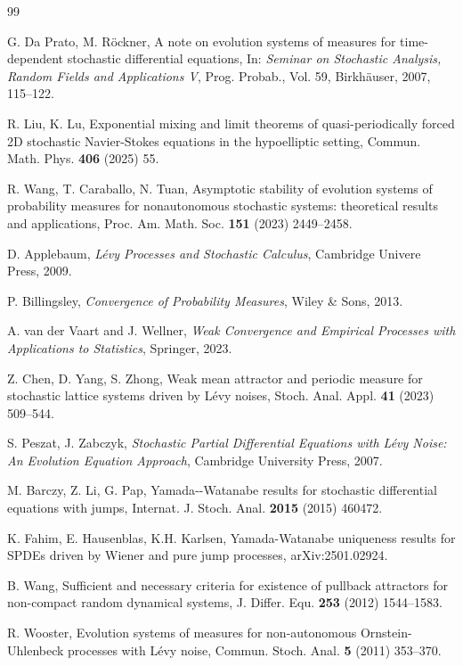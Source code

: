 \documentclass[11pt]{article}
\numberwithin{equation}{section}
\theoremstyle{plain}
\begin{document}
\begin{thebibliography}{99}
	

	G. Da Prato, M. R{\"o}ckner,
	A note on evolution systems of measures for time-dependent stochastic differential equations,
	In: \emph{Seminar on Stochastic Analysis, Random Fields and Applications V}, Prog. Probab., Vol. 59, Birkh{\"a}user, 2007, 115--122.
	
	R. Liu, K. Lu,
	Exponential mixing and limit theorems of quasi-periodically forced 2D stochastic Navier-Stokes equations in the hypoelliptic setting,
	Commun. Math. Phys. \textbf{406} (2025) 55.
	
	R. Wang, T. Caraballo, N. Tuan,
	Asymptotic stability of evolution systems of probability measures for nonautonomous stochastic systems: theoretical results and applications,
	Proc. Am. Math. Soc. \textbf{151} (2023) 2449--2458.
	
	
	D. Applebaum,
	\emph{L{\'e}vy Processes and Stochastic Calculus},
	Cambridge Univere Press, 2009.	
	


	P. Billingsley,
	\emph{Convergence of Probability Measures},
	Wiley \& Sons, 2013.
	
	A. van der Vaart and J. Wellner,
	\emph{Weak Convergence and Empirical Processes with Applications to Statistics},
	Springer, 2023.	
	
	Z. Chen, D. Yang, S. Zhong,
	Weak mean attractor and periodic measure for stochastic lattice systems driven by L{\'e}vy noises,
	Stoch. Anal. Appl. \textbf{41} (2023) 509--544.
		
	S. Peszat, J. Zabczyk,
	\emph{Stochastic Partial Differential Equations with L{\'e}vy Noise: An Evolution Equation Approach},
	Cambridge University Press, 2007. 
	
	M. Barczy, Z. Li, G. Pap, 
	Yamada‐-Watanabe results for stochastic differential equations with jumps,
	Internat. J. Stoch. Anal. \textbf{2015} (2015) 460472.
	
	K. Fahim, E. Hausenblas, K.H. Karlsen,
	Yamada-Watanabe uniqueness results for SPDEs driven by Wiener and pure jump processes, 
	arXiv:2501.02924.
	
	B. Wang, 
	Sufficient and necessary criteria for existence of pullback attractors for non-compact random dynamical systems, 
	J. Differ. Equ. \textbf{253} (2012) 1544--1583.	
	
	
	R. Wooster,
	Evolution systems of measures for non-autonomous Ornstein-Uhlenbeck processes with L{\'e}vy noise,
	Commun. Stoch. Anal. \textbf{5} (2011) 353--370.
	

\end{thebibliography}
\end{document}

